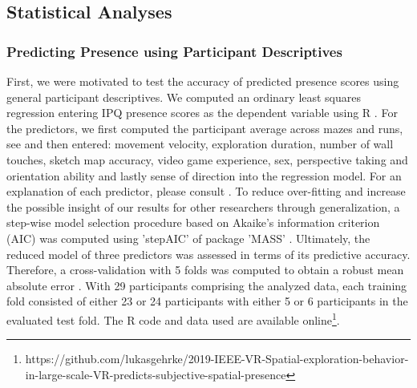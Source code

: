\subsection{Statistical Analyses}
\subsubsection{Predicting Presence using Participant Descriptives} First, we were motivated to test the accuracy of predicted presence scores using general participant descriptives. We computed an ordinary least squares regression entering IPQ presence scores as the dependent variable using R \cite{RFoundationforStatisticalComputing.2018}. For the predictors, we first computed the participant average across mazes and runs, see \cite{Gehrke2018} and then entered: movement velocity, exploration duration, number of wall touches, sketch map accuracy, video game experience, sex, perspective taking and orientation ability and lastly sense of direction into the regression model. For an explanation of each predictor, please consult \cite{Gehrke2018}. To reduce over-fitting and increase the possible insight of our results for other researchers through generalization, a step-wise model selection procedure based on Akaike's information criterion (AIC) was computed using 'stepAIC' of package 'MASS' \cite{Akaike1998a, Venables2002}.
Ultimately, the reduced model of three predictors was assessed in terms of its predictive accuracy. Therefore, a cross-validation with 5 folds was computed to obtain a robust mean absolute error \cite{Mosteller1968, Furnkranz2011}. With 29 participants comprising the analyzed data, each training fold consisted of either 23 or 24 participants with either 5 or 6 participants in the evaluated test fold. The R code and data used are available online\footnote{https://github.com/lukasgehrke/2019-IEEE-VR-Spatial-exploration-behavior-in-large-scale-VR-predicts-subjective-spatial-presence}.